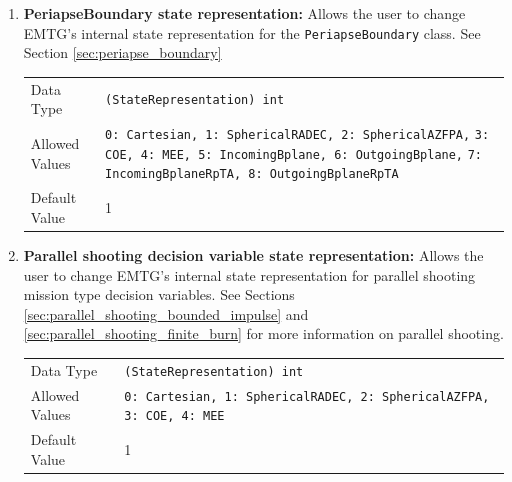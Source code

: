     \begin{enumerate}

        \item \textbf{PeriapseBoundary state representation:} Allows the user to change \ac{EMTG}'s internal state representation for the \verb|PeriapseBoundary| class. See Section \ref{sec:periapse_boundary}
        
            \begin{table}[H]
                \hspace{2cm}
                \begin{tabular}{lp{3cm}}
                Data Type & \verb|(StateRepresentation) int| \\
                Allowed Values & \verb|0: Cartesian, 1: SphericalRADEC, 2: SphericalAZFPA,| \newline
                    \verb|3: COE, 4: MEE, 5: IncomingBplane, 6: OutgoingBplane,|\newline 
                    \verb|7: IncomingBplaneRpTA, 8: OutgoingBplaneRpTA|  \\
                Default Value & 1 \\
                \end{tabular}
            \end{table}

        \item \textbf{Parallel shooting decision variable state representation:}  Allows the user to change \ac{EMTG}'s internal state representation for parallel shooting mission type decision variables. See Sections \ref{sec:parallel_shooting_bounded_impulse} and \ref{sec:parallel_shooting_finite_burn} for more information on parallel shooting.
        
            \begin{table}[H]
                \hspace{2cm}
                \begin{tabular}{lp{3cm}}
                Data Type & \verb|(StateRepresentation) int| \\
                Allowed Values & \verb|0: Cartesian, 1: SphericalRADEC, 2: SphericalAZFPA,| \newline
                    \verb|3: COE, 4: MEE| \\
                Default Value & 1 \\
                \end{tabular}
            \end{table}
        

\end{enumerate}
